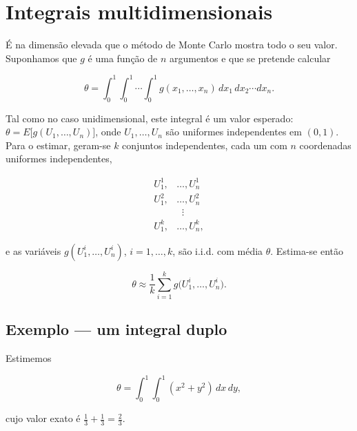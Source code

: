 \documentclass[
  portuguese,
  11pt,
  openany]{book}
\begin{document}
\section{Integrais multidimensionais}\label{integrais-multidimensionais}

É na dimensão elevada que o método de Monte Carlo mostra todo o seu valor.
Suponhamos que \(g\) é uma função de \(n\) argumentos e que se pretende calcular

\[
\theta = \int_{0}^{1}\!\int_{0}^{1}\!\cdots\!\int_{0}^{1}
g(x_1, \ldots, x_n)\, dx_1\, dx_2 \cdots dx_n.
\]

Tal como no caso unidimensional, este integral é um valor esperado:
\(\theta = E\big[g(U_1, \ldots, U_n)\big]\), onde \(U_1, \ldots, U_n\) são uniformes
independentes em \((0,1)\). Para o estimar, geram-se \(k\) conjuntos independentes,
cada um com \(n\) coordenadas uniformes independentes,

\begin{align*}
U_{1}^{1}, & \ldots, U_{n}^{1} \\
U_{1}^{2}, & \ldots, U_{n}^{2} \\
           & \;\;\vdots \\
U_{1}^{k}, & \ldots, U_{n}^{k},
\end{align*}

e as variáveis \(g(U_{1}^{i}, \ldots, U_{n}^{i})\), \(i = 1, \ldots, k\), são i.i.d.
com média \(\theta\). Estima-se então

\[
\theta \approx \frac{1}{k}\sum_{i=1}^{k} g\big(U_{1}^{i}, \ldots, U_{n}^{i}\big).
\]

\subsection{Exemplo --- um integral duplo}\label{exemplo-um-integral-duplo}

Estimemos

\[
\theta = \int_{0}^{1}\!\int_{0}^{1} (x^2 + y^2)\, dx\, dy,
\]

cujo valor exato é \(\tfrac{1}{3} + \tfrac{1}{3} = \tfrac{2}{3}\).
\end{document}
